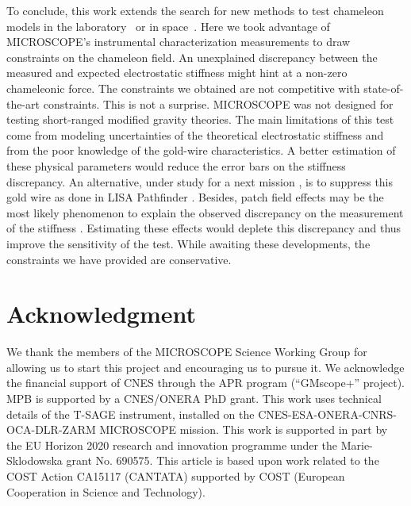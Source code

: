\documentclass[aps,prd,twocolumn,superscriptaddress,nofootinbib,eqsecnumm,showpacs]{revtex4-1}
\renewcommand\({\left(}
\renewcommand\){\right)}
\renewcommand\[{\left[}
\renewcommand\]{\right]}
\begin{document}
To conclude, this work extends the search for new methods to test chameleon models in the laboratory~\cite{PRD3} or in space~\cite{Berge:2019zjj,Berge:2018htm}. Here we took advantage of MICROSCOPE's instrumental characterization measurements to draw constraints on the chameleon field. An unexplained discrepancy between the measured and expected electrostatic stiffness might hint at a non-zero chameleonic force. The constraints we obtained are not competitive with state-of-the-art constraints. This is not a surprise. MICROSCOPE was not designed for testing short-ranged modified gravity theories.  The main limitations of this test come from modeling uncertainties of the theoretical electrostatic stiffness and from the poor knowledge of the gold-wire characteristics. A better estimation of these physical parameters would reduce the error bars on the stiffness discrepancy. An alternative, under study for a next mission \cite{battelier2019exploring}, is to suppress this gold wire as done in LISA Pathfinder \cite{PhysRevLett.116.231101}. Besides, patch field effects may be the most likely phenomenon to explain the observed discrepancy on the measurement of the stiffness \cite{CQG2}. Estimating these effects would deplete this discrepancy and thus improve the sensitivity of the test. While awaiting these developments, the constraints we have provided are conservative.


\section*{Acknowledgment}
We thank the members of the MICROSCOPE Science Working Group for allowing us to start this project and encouraging us to pursue it. We acknowledge the financial support of CNES through the APR program (``GMscope+'' project). MPB is supported by a CNES/ONERA PhD grant. This work uses technical details of the T-SAGE instrument, installed on the CNES-ESA-ONERA-CNRS-OCA-DLR-ZARM MICROSCOPE mission. This work is supported in part by the EU Horizon 2020 research and innovation programme under the Marie-Sklodowska grant No. 690575. This article is based upon work related to the COST Action CA15117 (CANTATA) supported by COST (European Cooperation in Science and Technology).


\appendix




\end{document}
